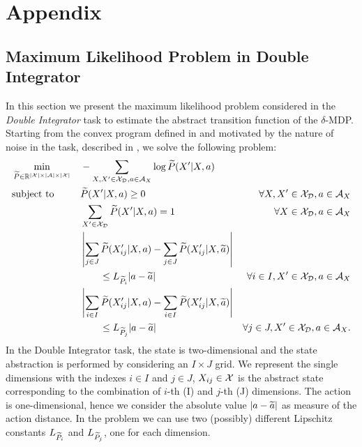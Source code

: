 \chapter{Appendix}

\section{Maximum Likelihood Problem in Double Integrator} \label{app:maxlike}
In this section we present the maximum likelihood problem considered in the \emph{Double Integrator} task to estimate the abstract transition function of the $\delta$-\ac{MDP}. Starting from the convex program defined in  and motivated by the nature of noise in the task, described in , we solve the following problem:
\begin{align}
&\min_{\widetilde{P}\in\mathbb{R}^{|\mathcal{X}|\times|\mathcal{A}|\times|\mathcal{X}|}} &&-\sum_{X,X'\in\mathcal{X}_{\mathcal{D}}, a\in\mathcal{A}_{X}}\log\widetilde{P}(X'|X,a) \nonumber\\
&\text{subject to} &&\widetilde{P}(X'|X,a) \geq 0 &\forall X,X'\in\mathcal{X}_{\mathcal{D}}, a\in\mathcal{A}_{X} \nonumber\\
& &&\sum_{X'\in\mathcal{X}_{\mathcal{D}}}\widetilde{P}(X'|X,a) = 1 &\forall X\in\mathcal{X}_{\mathcal{D}}, a\in\mathcal{A}_{X} \nonumber\\
& &&\left|\sum_{j \in J}\widetilde{P}(X'_{ij}|X,a) - \sum_{j \in J}\widetilde{P}(X'_{ij}|X,\widetilde{a})\right|& \nonumber \\
& && \qquad \leq L_{\widetilde{P}_{i}}|a- \widetilde{a}| &\forall i \in I,X'\in\mathcal{X}_{\mathcal{D}}, a\in\mathcal{A}_{X} \label{p:i}\\
& &&\left|\sum_{i \in I}\widetilde{P}(X'_{ij}|X,a) - \sum_{i \in I}\widetilde{P}(X'_{ij}|X,\widetilde{a})\right|& \nonumber \\
& && \qquad \leq L_{\widetilde{P}_{j}}|a- \widetilde{a}| &\forall j \in J,X'\in\mathcal{X}_{\mathcal{D}}, a\in\mathcal{A}_{X}. \label{p:j}
\end{align}
In the Double Integrator task, the state is two-dimensional and the state abstraction is performed by considering an $I \times J$ grid. We represent the single dimensions with the indexes $i \in I$ and $j \in J$, $X_{ij} \in \mathcal{X}$ is the abstract state corresponding to the combination of $i$-th (\wrt I) and $j$-th (\wrt J) dimensions. The action is one-dimensional, hence we consider the absolute value $|a-\widetilde{a}|$ as measure of the action distance. In the problem we can use two (possibly) different Lipschitz constants $L_{\widetilde{P}_{i}}$ and $L_{\widetilde{P}_{j}}$, one for each dimension.